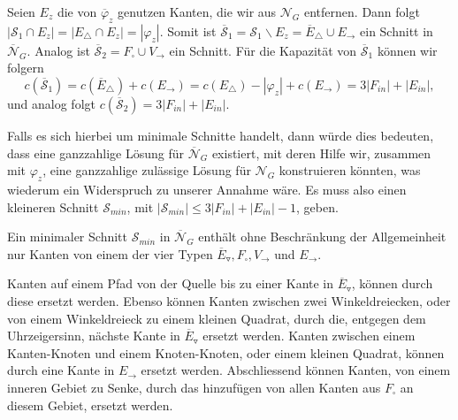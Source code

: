 Seien $E_z$ die von $\overline{\varphi}_z$ genutzen Kanten, die wir aus $\mathcal{N}_G$ entfernen. Dann folgt $|\mathcal{S}_1 \cap E_z| = |E_\triangle \cap E_z| = |\varphi_z|$. Somit ist $\overline{\mathcal{S}}_1 = \mathcal{S}_1 \backslash E_z = \overline{E}_\triangle \cup E_\to$ ein Schnitt in $\overline{\mathcal{N}}_G$. Analog ist $\overline{\mathcal{S}}_2 = F_\square \cup V_{\to}$ ein Schnitt. Für die Kapazität von $\overline{\mathcal{S}}_1$ können wir folgern 
$$ c(\overline{\mathcal{S}}_1) = c(\overline{E}_\triangle) + c(E_\to) = c(E_\triangle) - |\varphi_z| + c(E_\to) = 3|F_{in}| + |E_{in}|,$$
und analog folgt $c(\overline{\mathcal{S}}_2) = 3|F_{in}| + |E_{in}|$.

Falls es sich hierbei um minimale Schnitte handelt, dann würde dies bedeuten, dass eine ganzzahlige Lösung für $\overline{\mathcal{N}}_G$ existiert, mit deren Hilfe wir, zusammen mit $\varphi_z$, eine ganzzahlige zulässige Lösung für $\mathcal{N}_G$ konstruieren könnten, was wiederum ein Widerspruch zu unserer Annahme wäre. Es muss also einen kleineren Schnitt $\mathcal{S}_{min}$, mit $|\mathcal{S}_{min}| \leq 3|F_{in}| + |E_{in}| - 1$, geben. 

\begin{claim} \label{cut_types1}

Ein minimaler Schnitt $\mathcal{S}_{min}$ in $\overline{\mathcal{N}}_G$ enthält ohne Beschränkung der Allgemeinheit nur Kanten von einem der vier Typen $\overline{E}_\triangledown, F_\square, V_\to$ und $E_\to$.

\end{claim}

Kanten auf einem Pfad von der Quelle bis zu einer Kante in $\overline{E}_\triangledown$, können durch diese ersetzt werden. Ebenso können Kanten zwischen zwei Winkeldreiecken, oder von einem Winkeldreieck zu einem kleinen Quadrat, durch die, entgegen dem Uhrzeigersinn, nächste Kante in $\overline{E}_\triangledown$ ersetzt werden. Kanten zwischen einem Kanten-Knoten und einem Knoten-Knoten, oder einem kleinen Quadrat, können durch eine Kante in $E_\to$ ersetzt werden. Abschliessend können Kanten, von einem inneren Gebiet zu Senke, durch das hinzufügen von allen Kanten aus $F_\square$ an diesem Gebiet, ersetzt werden.

